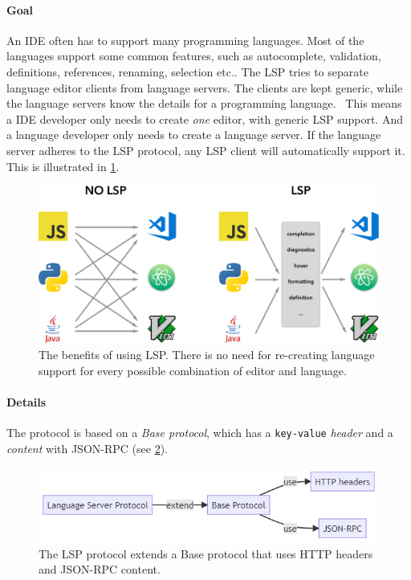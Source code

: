 \paragraph*{Goal} An \gls{IDE} often has to support many programming languages.
Most of the languages support some common features, such as autocomplete,  validation, definitions, references, renaming, selection etc..
The \gls{LSP} tries to separate language editor clients from language servers.
The clients are kept generic, while the language servers know the details for a programming language.~\cite{microsoftOverview}
This means a \gls{IDE} developer only needs to create \textit{one} editor, with generic \gls{LSP} support.
And a language developer only needs to create a language server.
If the language server adheres to the \gls{LSP} protocol, any \gls{LSP} client will automatically support it.
This is illustrated in \cref{fig:lsp-benefits}.

\begin{figure}[htbp]  %
  \centering
  \includegraphics[width=\textwidth]{figures/lsp-languages-editors}
  \caption[LSP Benefits]{The benefits of using \gls{LSP}. There is no need for re-creating language support for every possible combination of editor and language.~\cite{microsoftLanguageServerExtension2020}}\label{fig:lsp-benefits}
\end{figure}


\paragraph*{Details}
The protocol is based on a \emph{Base protocol}, which has a \texttt{key-value} \emph{header} and a \emph{content} with \gls{JSON-RPC} (see \cref{fig:lsp-protocol}).

\begin{figure}[htbp]
  \centering
  \includegraphics[width=\textwidth]{figures/lsp-protocol}
  \caption[The LSP Protocol]{The LSP protocol extends a Base protocol that uses HTTP headers and JSON-RPC content.}\label{fig:lsp-protocol}
\end{figure}

